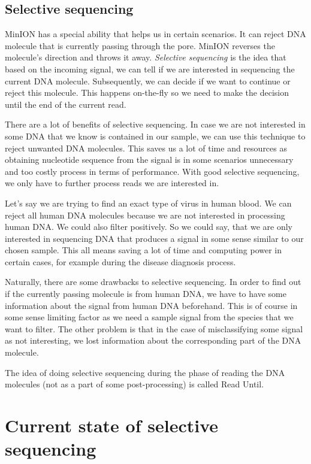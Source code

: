 \subsection{Selective sequencing}

MinION has a special ability that helps us in certain scenarios. It can reject
DNA molecule that is currently passing through the pore. MinION reverses the molecule’s direction and throws it away.
\textit{Selective sequencing} is the idea that based on the incoming signal, we can tell
if we are interested in sequencing the current DNA molecule. Subsequently, we can decide if we want
to continue or reject this molecule. This happens on-the-fly so we need to make
the decision until the end of the current read.

There are a lot of benefits of selective sequencing. In case we are not interested
in some DNA that we know is contained in our sample, we can use this technique to
reject unwanted DNA molecules. This saves us a lot of time and resources as obtaining
nucleotide sequence from the signal is in some scenarios unnecessary and too
costly process in terms of performance. With good selective sequencing, we only have
to further process reads we are interested in.

Let's say we are trying to find an exact type of virus in human blood. We can
reject all human DNA molecules because we are not interested in processing human
DNA. We could also filter positively. So we could say, that we are only
interested in sequencing DNA that produces a signal in some sense similar to our
chosen sample. This all means saving a lot of time and computing power in certain
cases, for example during the disease diagnosis process.

Naturally, there are some drawbacks to selective sequencing. In order to find out
if the currently passing molecule is from human DNA, we have to have some information
about the signal from human DNA beforehand.
This is of course in some sense limiting factor as we need a sample signal from
the species that we want to filter. The other problem is that in the case of misclassifying
some signal as not interesting, we lost information about the corresponding
part of the DNA molecule.

The idea of doing selective sequencing during the phase of reading the DNA molecules
(not as a part of some post-processing) is called Read Until. 

\section{Current state of selective sequencing}

